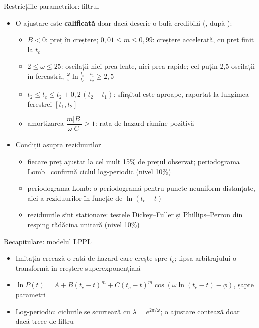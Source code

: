 \begin{frame}{Restricțiile parametrilor: filtrul}
\itemsize{\footnotesize}
\begin{itemize}
    \item O ajustare este \textbf{calificată} doar dacă descrie o bulă credibilă (, după ):
    \begin{itemize}
        \item $B < 0$: preț în creștere; $0{,}01 \le m \le 0{,}99$: creștere accelerată, cu preț finit la $t_c$
        \item $2 \le \omega \le 25$: oscilații nici prea lente, nici prea rapide; cel puțin 2,5 oscilații în fereastră, $\frac{\omega}{\pi}\ln\frac{t_c - t_1}{t_c - t_2} \ge 2{,}5$
        \item $t_2 \le t_c \le t_2 + 0{,}2\,(t_2 - t_1)$: sfîrșitul este aproape, raportat la lungimea ferestrei $[t_1, t_2]$
        \item amortizarea $\dfrac{m|B|}{\omega|C|} \ge 1$: rata de hazard rămîne pozitivă
    \end{itemize}
    \item Condiții asupra reziduurilor
    \begin{itemize}
        \item fiecare preț ajustat la cel mult 15\% de prețul observat; periodograma Lomb \ confirmă ciclul log-periodic (nivel 10\%)
        \item periodograma Lomb: o periodogramă pentru puncte neuniform distanțate, aici a reziduurilor în funcție de $\ln(t_c - t)$
        \item reziduurile sînt staționare: testele Dickey--Fuller și Phillips--Perron din  resping rădăcina unitară (nivel 10\%)
    \end{itemize}
\end{itemize}
\end{frame}

\begin{frame}{Recapitulare: modelul LPPL}
\itemsize{\small}
\begin{itemize}
    \item Imitația creează o rată de hazard care crește spre $t_c$; lipsa arbitrajului o transformă în creștere superexponențială
    \item $\ln P(t) = A + B(t_c - t)^m + C(t_c - t)^m\cos(\omega\ln(t_c - t) - \phi)$, șapte parametri
    \item Log-periodic: ciclurile se scurtează cu $\lambda = e^{2\pi/\omega}$; o ajustare contează doar dacă trece de filtru
\end{itemize}
\end{frame}


